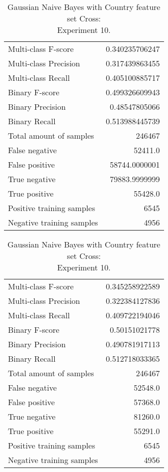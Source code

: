 \begin{table}[H]
\begin{minipage}{0.5\textwidth}
\caption{Gaussian Naive Bayes with Country feature set Cross: \\Experiment 9.}
\centering
\begin{tabular}{l r}
\toprule
Multi-class F-score & 0.340235706247 \\
Multi-class Precision & 0.317439863455 \\
Multi-class Recall & 0.405100885717 \\
\midrule
Binary F-score & 0.499326609943 \\
Binary Precision & 0.48547805066 \\
Binary Recall & 0.513988445739 \\
\midrule
Total amount of samples & 246467 \\
False negative & 52411.0 \\
False positive & 58744.0000001 \\
True negative & 79883.9999999 \\
True positive & 55428.0 \\
\midrule
Positive training samples & 6545 \\
Negative training samples & 4956 \\
\bottomrule
\end{tabular}
\end{minipage}
\hfillx
\begin{minipage}{0.5\textwidth}
\caption{Gaussian Naive Bayes with Country feature set Cross: \\Experiment 10.}
\centering
\begin{tabular}{l r}
\toprule
Multi-class F-score & 0.345258922589 \\
Multi-class Precision & 0.322384127836 \\
Multi-class Recall & 0.409722194046 \\
\midrule
Binary F-score & 0.50151021778 \\
Binary Precision & 0.490781917113 \\
Binary Recall & 0.512718033365 \\
\midrule
Total amount of samples & 246467 \\
False negative & 52548.0 \\
False positive & 57368.0 \\
True negative & 81260.0 \\
True positive & 55291.0 \\
\midrule
Positive training samples & 6545 \\
Negative training samples & 4956 \\
\bottomrule
\end{tabular}
\end{minipage}
\end{table}
